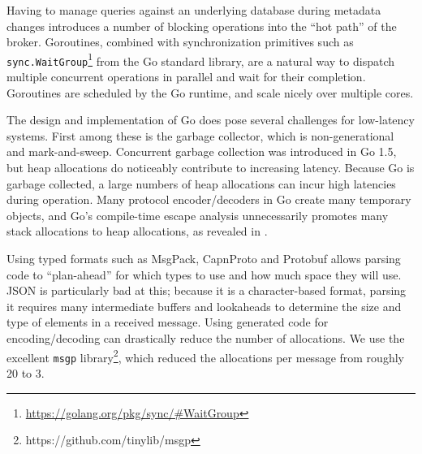 Having to manage queries against an underlying database during metadata changes introduces a number of blocking operations into the ``hot path'' of the broker.
Goroutines, combined with synchronization primitives such as \texttt{sync.WaitGroup}\footnote{\url{https://golang.org/pkg/sync/#WaitGroup}} from the Go standard library, are a natural way to dispatch multiple concurrent operations in parallel and wait for their completion.
Goroutines are scheduled by the Go runtime, and scale nicely over multiple cores.

The design and implementation of Go does pose several challenges for low-latency systems.
First among these is the garbage collector, which is non-generational and mark-and-sweep.
Concurrent garbage collection was introduced in Go 1.5, but heap allocations do noticeably contribute to increasing latency.
Because Go is garbage collected, a large numbers of heap allocations can incur high latencies during
operation.
Many protocol encoder/decoders in Go create many temporary objects, and Go's compile-time escape analysis unnecessarily promotes many stack allocations to heap allocations, as revealed
in \cite{goescape}.

Using typed formats such as MsgPack, CapnProto and Protobuf allows parsing code to ``plan-ahead'' for which types to use and how much space they will use.
JSON is particularly bad at this; because it is a character-based format, parsing it requires many intermediate buffers and lookaheads to determine the size and type of elements in a received message.
Using generated code for encoding/decoding can drastically reduce the number of allocations. We use the excellent \texttt{msgp} library\footnote{https://github.com/tinylib/msgp}, which reduced the allocations per message from roughly 20 to 3.




